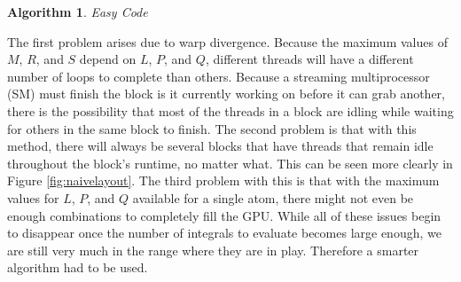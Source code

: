 \documentclass[12pt]{report}
\newtheorem{algorithm}[theorem]{Algorithm}
\begin{document}
\begin{algorithm}
\caption{Easy Code}
\label{easycode}
\begin{algorithmic}

\STATE{}
				\ELSE
				\ENDIF
					\ELSE
					\ENDIF
					\ENDFOR
				\ENDFOR
			\ENDFOR
\ENDIF
\end{algorithmic}
\end{algorithm}

The first problem arises due to warp divergence. Because the maximum values of $M$, $R$, and $S$ depend on $L$, $P$, and $Q$, different threads will have a different number of loops to complete than others. Because a streaming multiprocessor (SM) must finish the block is it currently working on before it can grab another, there is the possibility that most of the threads in a block are idling while waiting for others in the same block to finish. The second problem is that with this method, there will always be several blocks that have threads that remain idle throughout the block's runtime, no matter what. This can be seen more clearly in Figure \ref{fig:naivelayout}. The third problem with this is that with the maximum values for $L$, $P$, and $Q$ available for a single atom, there might not even be enough combinations to completely fill the GPU. While all of these issues begin to disappear once the number of integrals to evaluate becomes large enough, we are still very much in the range where they are in play. Therefore a smarter algorithm had to be used.
\end{document}
